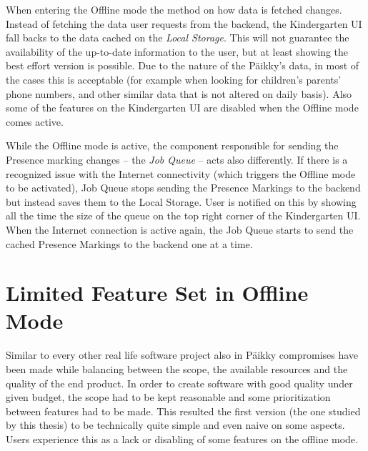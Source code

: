When entering the Offline mode the method on how data is fetched changes. Instead of fetching the data user requests from the backend, the Kindergarten UI fall backs to the data cached on the \textit{Local Storage}. This will not guarantee the availability of the up-to-date information to the user, but at least showing the best effort version is possible. Due to the nature of the Päikky's data, in most of the cases this is acceptable (for example when looking for children's parents' phone numbers, and other similar data that is not altered on daily basis). Also some of the features on the Kindergarten UI are disabled when the Offline mode comes active. %

While the Offline mode is active, the component responsible for sending the Presence marking changes -- the \textit{Job Queue} -- acts also differently. If there is a recognized issue with the Internet connectivity (which triggers the Offline mode to be activated), Job Queue stops sending the Presence Markings to the backend but instead saves them to the Local Storage. User is notified on this by showing all the time the size of the queue on the top right corner of the Kindergarten UI. When the Internet connection is active again, the Job Queue starts to send the cached Presence Markings to the backend one at a time. %





\section{Limited Feature Set in Offline Mode}
\label{sec:limitedfeatureset}

Similar to every other real life software project also in Päikky compromises have been made while balancing between the scope, the available resources and the quality of the end product. In order to create software with good quality under given budget, the scope had to be kept reasonable and some prioritization between features had to be made. This resulted the first version (the one studied by this thesis) to be technically quite simple and even naive on some aspects. Users experience this as a lack or disabling of some features on the offline mode.




